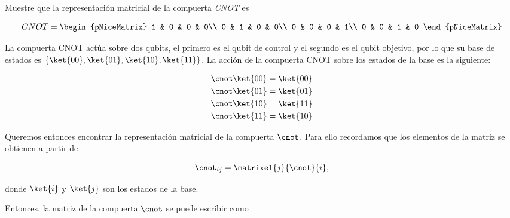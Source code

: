 \documentclass[./../main.tex]{subfiles}
\begin{document}
    \section{}

    Muestre que la representación matricial de la compuerta \emph{CNOT} es

    \begin{equation*}
        CNOT = \begin{pNiceMatrix}
            1 & 0 & 0 & 0\\
            0 & 1 & 0 & 0\\
            0 & 0 & 0 & 1\\
            0 & 0 & 1 & 0
        \end{pNiceMatrix}
    \end{equation*}

    \startsolution

    La compuerta \(\mathrm{CNOT}\) actúa sobre dos qubits, el primero es el qubit de control y el segundo es el qubit objetivo, por lo que su base de estados es \(\{\ket{00}, \ket{01}, \ket{10}, \ket{11}\}\). La acción de la compuerta \(\mathrm{CNOT}\) sobre los estados de la base es la siguiente:

    \begin{align*}
        \cnot \ket{00} &= \ket{00}\\
        \cnot \ket{01} &= \ket{01}\\
        \cnot \ket{10} &= \ket{11}\\
        \cnot \ket{11} &= \ket{10}\\
    \end{align*}

    Queremos entonces encontrar la representación matricial de la compuerta \(\cnot\). Para ello recordamos que los elementos de la matriz se obtienen a partir de

    \begin{equation*}
        \cnot_{ij} = \matrixel{j}{\cnot}{i},
    \end{equation*}

    donde \(\ket{i}\) y \(\ket{j}\) son los estados de la base.
    
    Entonces, la matriz de la compuerta \(\cnot\) se puede escribir como
\end{document}
